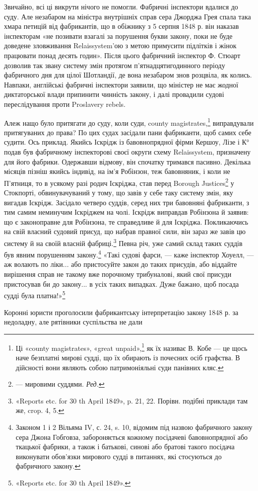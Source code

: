 Звичайно, всі ці викрути нічого не помогли. Фабричні інспектори
вдалися до суду. Але незабаром на міністра внутрішніх
справ сера Джорджа Грея спала така хмара петицій від фабрикантів,
що в обіжнику з 5 серпня 1848 р. він наказав інспекторам
«не позивати взагалі за порушення букви закону, поки не буде
доведене зловживання Relaissystem’ою з метою примусити підлітків
і жінок працювати понад десять годин». Після цього фабричний
інспектор Ф. Стюарт дозволив так звану систему змін протягом
п’ятнадцятигодинного періоду фабричного дня для цілої Шотландії,
де вона незабаром знов розцвіла, як колись. Навпаки,
англійські фабричні інспектори заявили, що міністер не має
жодної диктаторської влади припинити чинність закону, і далі
провадили судові переслідування проти Proslavery rebels.

Алеж нащо було притягати до суду, коли суди, county magistrates,\footnote{
Ці «county magistrates», «great unpaid»,\footnote*{
— величні неоплачувані. \emph{Ред.}
} як їх називає В. Кобе
— це щось наче безплатні мирові судді, що їх обирають із почесних
осіб графства. В дійсності вони являють собою патримоніяльні суди панівних
кляс.
}
виправдували притягуваних до права? По цих судах
засідали пани фабриканти, щоб самих себе судити. Ось приклад.
Якийсь Іскрідж із бавовнопрядної фірми Кершоу, Лізе і К°
подав був фабричному інспекторові своєї округи схему Relaissystem,
призначену для його фабрики. Одержавши відмову,
він спочатку тримався пасивно. Декілька місяців пізніш якийсь
індивід, на ім’я Робінзон, теж бавовняник, і коли не П’ятниця,
то в усякому разі родич Іскріджа, став перед Borough Justices\footnote*{
— мировими суддями. \emph{Ред.}
}
у Стокпорті, обвинувачуваний у тому, що завів у себе таку
систему змін, яку вигадав Іскрідж. Засідало четверо суддів,
серед них три бавовняні фабриканти, з тим самим неминучим
Іскріджем на чолі. Іскрідж виправдав Робінзона й заявив: що є
законоправне для Робінзона, те справедливе й для Іскріджа.
Покликаючись на свій власний судовий присуд, що набрав правної
сили, він зараз же завів цю систему й на своїй власній фабриці.\footnote{
«Reports etc. for 30 th April 1849», p. 21, 22. Порівн. подібні
приклади там же, crop. 4, 5.
}
Певна річ, уже самий склад таких суддів був явним порушенням
закону.\footnote{
Законом 1 і 2 Вільяма IV, с. 24, s. 10, відомим під назвою фабричного
закону сера Джона Гобговза, забороняється кожному посідачеві
бавовнопрядної або ткацької фабрики, а також і батькові, синові або
братові такого посідача виконувати обов'язки мирового судді в питаннях,
які стосуються до фабричного закону.
} «Такі судові фарси, — каже інспектор Хоуелл, —
аж волають по ліки... або пристосуйте закон до таких присудів,
або віддайте вирішення справ не такому вже порочному трибуналові,
який свої присуди пристосував би до закону... в усіх таких
випадках. Дуже бажано, щоб посада судді була платна!»\footnote{
«Reports etc. for 30 th April 1849».
}

Коронні юристи проголосили фабрикантську інтерпретацію
закону 1848 р. за недоладну, але рятівники суспільства не дали
\parbreak{}  %
